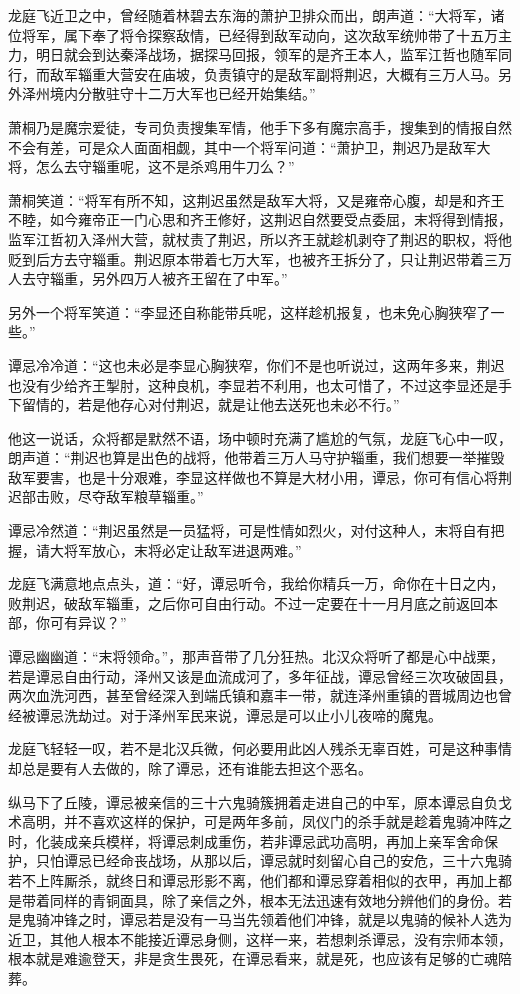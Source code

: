 龙庭飞近卫之中，曾经随着林碧去东海的萧护卫排众而出，朗声道：“大将军，诸位将军，属下奉了将令探察敌情，已经得到敌军动向，这次敌军统帅带了十五万主力，明日就会到达秦泽战场，据探马回报，领军的是齐王本人，监军江哲也随军同行，而敌军辎重大营安在庙坡，负责镇守的是敌军副将荆迟，大概有三万人马。另外泽州境内分散驻守十二万大军也已经开始集结。”

萧桐乃是魔宗爱徒，专司负责搜集军情，他手下多有魔宗高手，搜集到的情报自然不会有差，可是众人面面相觑，其中一个将军问道：“萧护卫，荆迟乃是敌军大将，怎么去守辎重呢，这不是杀鸡用牛刀么？”

萧桐笑道：“将军有所不知，这荆迟虽然是敌军大将，又是雍帝心腹，却是和齐王不睦，如今雍帝正一门心思和齐王修好，这荆迟自然要受点委屈，末将得到情报，监军江哲初入泽州大营，就杖责了荆迟，所以齐王就趁机剥夺了荆迟的职权，将他贬到后方去守辎重。荆迟原本带着七万大军，也被齐王拆分了，只让荆迟带着三万人去守辎重，另外四万人被齐王留在了中军。”

另外一个将军笑道：“李显还自称能带兵呢，这样趁机报复，也未免心胸狭窄了一些。”

谭忌冷冷道：“这也未必是李显心胸狭窄，你们不是也听说过，这两年多来，荆迟也没有少给齐王掣肘，这种良机，李显若不利用，也太可惜了，不过这李显还是手下留情的，若是他存心对付荆迟，就是让他去送死也未必不行。”

他这一说话，众将都是默然不语，场中顿时充满了尴尬的气氛，龙庭飞心中一叹，朗声道：“荆迟也算是出色的战将，他带着三万人马守护辎重，我们想要一举摧毁敌军要害，也是十分艰难，李显这样做也不算是大材小用，谭忌，你可有信心将荆迟部击败，尽夺敌军粮草辎重。”

谭忌冷然道：“荆迟虽然是一员猛将，可是性情如烈火，对付这种人，末将自有把握，请大将军放心，末将必定让敌军进退两难。”

龙庭飞满意地点点头，道：“好，谭忌听令，我给你精兵一万，命你在十日之内，败荆迟，破敌军辎重，之后你可自由行动。不过一定要在十一月月底之前返回本部，你可有异议？”

谭忌幽幽道：“末将领命。”，那声音带了几分狂热。北汉众将听了都是心中战栗，若是谭忌自由行动，泽州又该是血流成河了，多年征战，谭忌曾经三次攻破固县，两次血洗河西，甚至曾经深入到端氏镇和嘉丰一带，就连泽州重镇的晋城周边也曾经被谭忌洗劫过。对于泽州军民来说，谭忌是可以止小儿夜啼的魔鬼。

龙庭飞轻轻一叹，若不是北汉兵微，何必要用此凶人残杀无辜百姓，可是这种事情却总是要有人去做的，除了谭忌，还有谁能去担这个恶名。

纵马下了丘陵，谭忌被亲信的三十六鬼骑簇拥着走进自己的中军，原本谭忌自负戈术高明，并不喜欢这样的保护，可是两年多前，凤仪门的杀手就是趁着鬼骑冲阵之时，化装成亲兵模样，将谭忌刺成重伤，若非谭忌武功高明，再加上亲军舍命保护，只怕谭忌已经命丧战场，从那以后，谭忌就时刻留心自己的安危，三十六鬼骑若不上阵厮杀，就终日和谭忌形影不离，他们都和谭忌穿着相似的衣甲，再加上都是带着同样的青铜面具，除了亲信之外，根本无法迅速有效地分辨他们的身份。若是鬼骑冲锋之时，谭忌若是没有一马当先领着他们冲锋，就是以鬼骑的候补人选为近卫，其他人根本不能接近谭忌身侧，这样一来，若想刺杀谭忌，没有宗师本领，根本就是难逾登天，非是贪生畏死，在谭忌看来，就是死，也应该有足够的亡魂陪葬。

